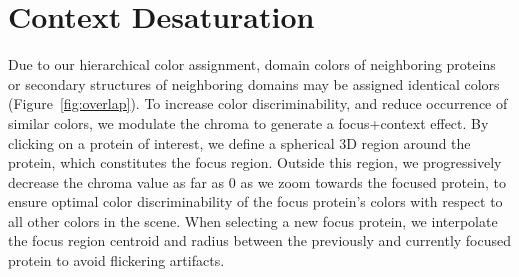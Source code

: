\documentclass{egpubl}
\begin{document}
	

	
	
	\section{Context Desaturation}
	\label{sec:chroma}
	
	
	Due to our hierarchical color assignment, domain colors of neighboring proteins or secondary structures of neighboring domains may be assigned identical colors (Figure~\ref{fig:overlap}).
	To increase color discriminability, and reduce occurrence of similar colors, we modulate the chroma to generate a focus+context effect. 
	By clicking on a protein of interest, we define a spherical 3D region around the protein, which constitutes the focus region. 
	Outside this region, we progressively decrease the chroma value as far as 0 as we zoom towards the focused protein, to ensure optimal color discriminability of the focus protein's colors with respect to all other colors in the scene. 
	When selecting a new focus protein, we interpolate the focus region centroid and radius between the previously and currently focused protein to avoid flickering artifacts.

	
	
	
\end{document}
